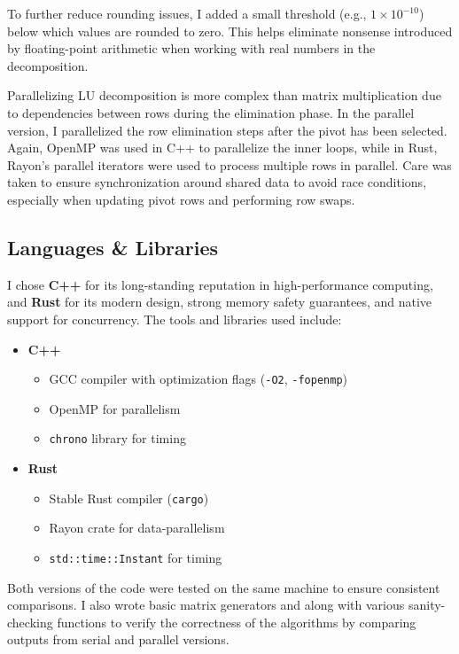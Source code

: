 \documentclass[12pt]{article}
\begin{document}
To further reduce rounding issues, I added a small threshold (e.g., \(1 \times 10^{-10}\)) below which values are rounded to zero. This helps eliminate nonsense
introduced by floating-point arithmetic when working with real numbers in the decomposition.

Parallelizing LU decomposition is more complex than matrix multiplication due to dependencies between rows during the elimination phase. In the parallel version,
I parallelized the row elimination steps after the pivot has been selected. Again, OpenMP was used in C++ to parallelize the inner loops, while in Rust, Rayon's
parallel iterators were used to process multiple rows in parallel. Care was taken to ensure synchronization around shared data to avoid race conditions,
especially when updating pivot rows and performing row swaps.

\subsection*{Languages \& Libraries}

I chose \textbf{C++} for its long-standing reputation in high-performance computing, and \textbf{Rust} for its modern design, strong memory safety guarantees,
and native support for concurrency. The tools and libraries used include:

\begin{itemize}
    \item \textbf{C++}
          \begin{itemize}
              \item GCC compiler with optimization flags (\texttt{-O2}, \texttt{-fopenmp})
              \item OpenMP for parallelism
              \item \texttt{chrono} library for timing
          \end{itemize}

    \item \textbf{Rust}
          \begin{itemize}
              \item Stable Rust compiler (\texttt{cargo})
              \item Rayon crate for data-parallelism
              \item \texttt{std::time::Instant} for timing
          \end{itemize}
\end{itemize}

Both versions of the code were tested on the same machine to ensure consistent comparisons. I also wrote basic matrix generators and along with various
sanity-checking functions to verify the correctness of the algorithms by comparing outputs from serial and parallel versions.
\end{document}
